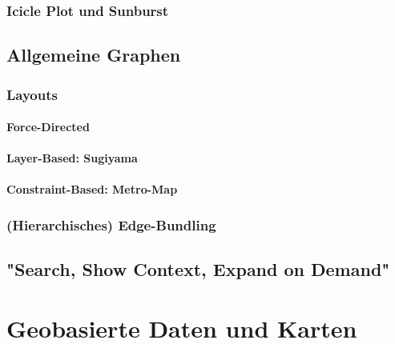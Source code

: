             \subsubsection{Icicle Plot und Sunburst} %

        \subsection{Allgemeine Graphen} %

            \subsubsection{Layouts} %

                \paragraph{Force-Directed} %

                \paragraph{Layer-Based: Sugiyama} %

                \paragraph{Constraint-Based: Metro-Map} %

            \subsubsection{(Hierarchisches) Edge-Bundling} %

        \subsection{"Search, Show Context, Expand on Demand"} %

    \section{Geobasierte Daten und Karten} %

